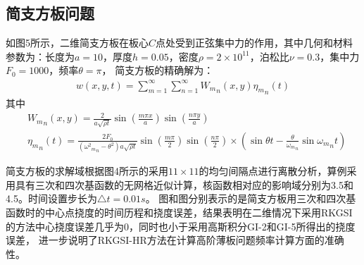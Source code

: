 \documentclass[a4paper]{article}
\begin{document}
\subsection{简支方板问题}
如图5所示，二维简支方板在板心$C$点处受到正弦集中力的作用，其中几何和材料参数为：长度为$a=10$，厚度$h=0.05$，密度$\rho=2\times 10^{11}$，泊松比$\nu=0.3$，集中力$F_0=1000$，频率$\theta=\pi$，
简支方板的精确解为：
\begin{equation}
\begin{split}
    w (x,y,t) = \mathop \sum \limits_{m = 1}^\infty  \mathop \sum \limits_{n = 1}^\infty  {W_m}_n(x,y){\eta _m}_n(t) 
\end{split}
\end{equation}
其中
\begin{equation}
\begin{split}
&{W_m}_n(x,y) = \frac{2}{{a\sqrt {\rho t} }}\sin (\frac{{m\pi x}}{a})\sin (\frac{{n\pi y}}{a})\\
&{\eta _m}_n(t) = \frac{{2{F_0}}}{{({\omega ^2}{{_m}_n} - {\theta ^2})a\sqrt {\rho t} }}\sin (\frac{{m\pi }}{2})\sin (\frac{{n\pi }}{2}) \times (\sin \theta t - \frac{\theta }{{{\omega _m}_n}}\sin {\omega _m}_nt)
\end{split}
\end{equation}
\begin{figure}[!h]
\begin{floatrow}
\end{floatrow}
\end{figure}
简支方板的求解域根据图4所示的采用$11\times 11$的均匀间隔点进行离散分析，算例采用具有三次和四次基函数的无网格近似计算，核函数相对应的影响域分别为3.5和4.5。时间设置步长为$\triangle t=0.01s$。
图和图分别表示的是简支方板用三次和四次基函数时的中心点挠度的时间历程和挠度误差，结果表明在二维情况下采用RKGSI的方法中心挠度误差几乎为0，同时也小于采用高斯积分GI-2和GI-5所得出的挠度误差，
进一步说明了RKGSI-HR方法在计算高阶薄板问题频率计算方面的准确性。


\end{document}
